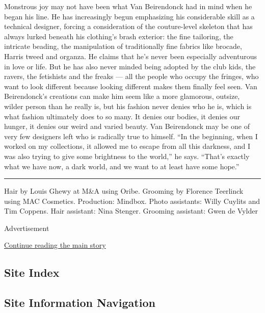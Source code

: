 Monstrous joy may not have been what Van Beirendonck had in mind when he
began his line. He has increasingly begun emphasizing his considerable
skill as a technical designer, forcing a consideration of the
couture-level skeleton that has always lurked beneath his clothing's
brash exterior: the fine tailoring, the intricate beading, the
manipulation of traditionally fine fabrics like brocade, Harris tweed
and organza. He claims that he's never been especially adventurous in
love or life. But he has also never minded being adopted by the club
kids, the ravers, the fetishists and the freaks --- all the people who
occupy the fringes, who want to look different because looking different
makes them finally feel seen. Van Beirendonck's creations can make him
seem like a more glamorous, outsize, wilder person than he really is,
but his fashion never denies who he is, which is what fashion ultimately
does to so many. It denies our bodies, it denies our hunger, it denies
our weird and varied beauty. Van Beirendonck may be one of very few
designers left who is radically true to himself. ``In the beginning,
when I worked on my collections, it allowed me to escape from all this
darkness, and I was also trying to give some brightness to the world,''
he says. ``That's exactly what we have now, a dark world, and we want to
at least have some hope.''

\begin{center}\rule{0.5\linewidth}{\linethickness}\end{center}

Hair by Louis Ghewy at M\&A using Oribe. Grooming by Florence Teerlinck
using MAC Cosmetics. Production: Mindbox. Photo assistants: Willy
Cuylits and Tim Coppens. Hair assistant: Nina Stenger. Grooming
assistant: Gwen de Vylder

Advertisement

\protect\hyperlink{after-bottom}{Continue reading the main story}

\hypertarget{site-index}{%
\subsection{Site Index}\label{site-index}}

\hypertarget{site-information-navigation}{%
\subsection{Site Information
Navigation}\label{site-information-navigation}}

